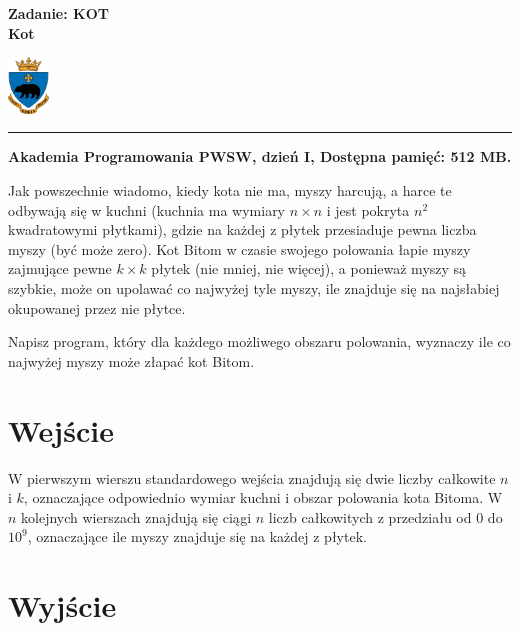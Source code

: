 \documentclass[10pt]{article}
\begin{document}
    

    \noindent
    \begin{minipage}{0.5\textwidth}
        \LARGE{\textsf{\textbf{Zadanie: KOT\\Kot}}}
    \end{minipage}
    \begin{minipage}{0.5\textwidth}
        \begin{flushright}
            \includegraphics[height=1.5cm]{logo.jpg}
        \end{flushright}
    \end{minipage}
    
    \noindent\rule{\textwidth}{0.4pt}
    
    \noindent\textbf{Akademia Programowania PWSW, dzień I, Dostępna pamięć: 512 MB.}
    \vspace{1em}
    
    
    \noindent
    Jak powszechnie wiadomo, kiedy kota nie ma, myszy harcują, a harce te odbywają się w kuchni (kuchnia ma wymiary $n \times n$ i jest pokryta $n^{2}$ kwadratowymi płytkami), gdzie na każdej z płytek przesiaduje pewna liczba myszy (być może zero). Kot Bitom w czasie swojego polowania łapie myszy zajmujące pewne $k \times k$ płytek (nie mniej, nie więcej), a ponieważ myszy są szybkie, może on upolawać co najwyżej tyle myszy, ile znajduje się na najsłabiej okupowanej przez nie płytce.

    Napisz program, który dla każdego możliwego obszaru polowania, wyznaczy ile co najwyżej myszy może złapać kot Bitom.


    \section*{Wejście}
    
    W pierwszym wierszu standardowego wejścia znajdują się dwie liczby całkowite $n$ i $k$, oznaczające odpowiednio wymiar kuchni i obszar polowania kota Bitoma. W $n$ kolejnych wierszach znajdują się ciągi $n$ liczb całkowitych z przedziału od 0 do $10^{9}$, oznaczające ile myszy znajduje się na każdej z płytek.


    \section*{Wyjście}
    
\end{document}
